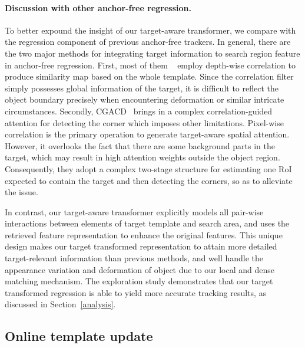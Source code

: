 \documentclass[10pt,twocolumn,letterpaper]{article}
\begin{document}
\paragraph{Discussion with other anchor-free regression.}

To better expound the insight of our target-aware transformer, we compare with the regression component of previous anchor-free trackers. In general, there are the two major methods for integrating target information to search region feature in anchor-free regression. 
First, most of them ~\cite{siamfc++,siamcar,siamban,ocean} employ depth-wise correlation to produce similarity map based on the whole template. Since the correlation filter simply possesses global information of the target, it is difficult to reflect the object boundary precisely when encountering deformation or similar intricate circumstances. 
Secondly, CGACD~\cite{CGACD} brings in a complex correlation-guided attention for detecting the corner which imposes other limitations. Pixel-wise correlation is the primary operation to generate target-aware spatial attention. However, it overlooks the fact that there are some background parts in the target, which may result in high attention weights outside the object region. Consequently, they adopt a complex two-stage structure for estimating one RoI expected to contain the target and then detecting the corners, so as to alleviate the issue.

In contrast, our target-aware transformer explicitly models all pair-wise interactions between elements of target template and search area, and uses the retrieved feature representation to enhance the original features. This unique design makes our target transformed representation to attain more detailed target-relevant information than previous methods, and well handle the appearance variation and deformation of object due to our local and dense matching mechanism. The exploration study demonstrates that our target transformed regression is able to yield more accurate tracking results, as discussed in Section~\ref{analysis}.

\subsection{Online template update} \label{online_trans_sect}
\end{document}
